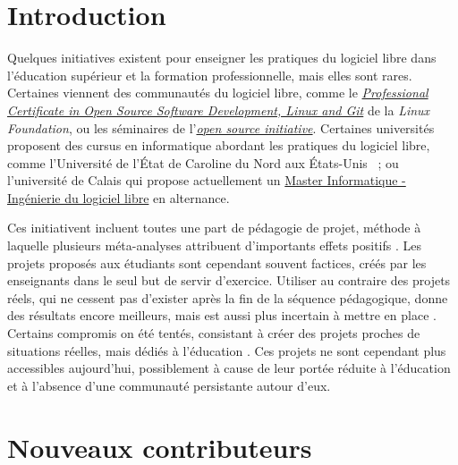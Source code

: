 \documentclass[dvipsnames,runningheads]{llncs}
\newcommand{\en}[1]{\foreignlanguage{english}{\emph{#1}}}
\begin{document}

    \section{Introduction}

    Quelques initiatives existent pour enseigner les pratiques du logiciel libre dans l'éducation supérieur et
    la formation professionnelle, mais elles sont rares. Certaines viennent des communautés du logiciel libre,
    comme le
    \href{https://www.edx.org/professional-certificate/linuxfoundationx-open-source-software-development-linux-and-git}{\en{Professional
    Certificate in Open Source Software Development, Linux and Git}} de la \en{Linux Foundation}, ou les
    séminaires de l'\href{https://opensource.org/osi-open-source-education}{\en{open source initiative}}.
    Certaines universités proposent des cursus en informatique abordant les pratiques du logiciel libre, comme
    l'Université de l'État de Caroline du Nord aux États-Unis \parencite{oss-edu-2008} ; ou
    l'université de Calais qui propose actuellement un
    \href{https://www.univ-littoral.fr/formation/offre-de-formation/masters/master-informatique-ingenierie-du-logiciel-libre/}{Master
    Informatique - Ingénierie du logiciel libre} en alternance.

    Ces initiativent incluent toutes une part de pédagogie de projet, méthode à laquelle plusieurs
    méta-analyses attribuent d'importants effets positifs \cite{pbl-2019, pbl-2018}. Les projets proposés aux
    étudiants sont cependant souvent factices, créés par les enseignants dans le seul but de servir
    d'exercice. Utiliser au contraire des projets réels, qui ne cessent pas d'exister après la fin de la
    séquence pédagogique, donne des résultats encore meilleurs, mais est aussi plus incertain à mettre en
    place \cite{real-pbl-2010, real-pbl-2004}. Certains compromis on été tentés, consistant à créer des
    projets proches de situations réelles, mais dédiés à l'éducation \cite{oss-edu-2008}. Ces projets ne sont
    cependant plus accessibles aujourd'hui, possiblement à cause de leur portée réduite à l'éducation et à
    l'absence d'une communauté persistante autour d'eux.

    \section{Nouveaux contributeurs}
\end{document}
